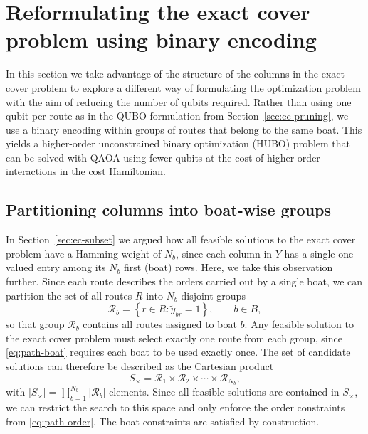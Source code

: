 \documentclass{article}
\begin{document}
\section{Reformulating the exact cover problem using binary encoding}
\label{sec:binary-encoding}

In this section we take advantage of the structure of the columns in the exact cover problem to explore a different way of formulating the optimization problem with the aim of reducing the number of qubits required.
Rather than using one qubit per route as in the QUBO formulation from Section~\ref{sec:ec-pruning}, we use a binary encoding within groups of routes that belong to the same boat. This yields a higher-order unconstrained binary optimization (HUBO) problem that can be solved with QAOA using fewer qubits at the cost of higher-order interactions in the cost Hamiltonian.


\subsection{Partitioning columns into boat-wise groups}
\label{sec:bucket-partition}

In Section~\ref{sec:ec-subset} we argued how all feasible solutions to the exact cover problem have a Hamming weight of $N_b$, since each column in $Y$ has a single one-valued entry among its $N_b$ first (boat) rows.
Here, we take this observation further. Since each route describes the orders carried out by a single boat, we can partition the set of all routes $R$ into $N_b$ disjoint groups
\begin{equation}
    \mathcal{R}_b = \left\{ r \in R : \tilde{y}_{br} = 1 \right\}, \qquad b \in B,
    \label{eq:bucket-def}
\end{equation}
so that group $\mathcal{R}_b$ contains all routes assigned to boat $b$.
Any feasible solution to the exact cover problem must select exactly one route from each group, since \eqref{eq:path-boat} requires each boat to be used exactly once. The set of candidate solutions can therefore be described as the Cartesian product
\begin{equation}
    S_{\times} = \mathcal{R}_1 \times \mathcal{R}_2 \times \cdots \times \mathcal{R}_{N_b},
    \label{eq:bucket-space}
\end{equation}
with $|S_{\times}| = \prod_{b=1}^{N_b} |\mathcal{R}_b|$ elements.
Since all feasible solutions are contained in $S_{\times}$, we can restrict the search to this space and only enforce the order constraints from \eqref{eq:path-order}. The boat constraints are satisfied by construction.
\end{document}
